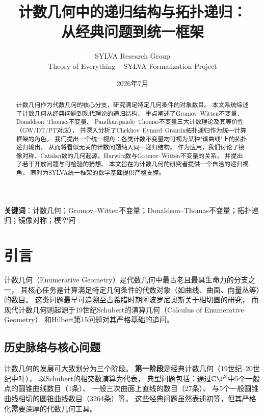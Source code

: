 \documentclass[11pt,a4paper]{article}
\title{\textbf{计数几何中的递归结构与拓扑递归：\\[2pt]
从经典问题到统一框架}}
\author{SYLVA Research Group \\[2pt]
\small Theory of Everything -- SYLVA Formalization Project}
\date{2026年7月}
\theoremstyle{plain}
\theoremstyle{definition}
\newcommand{\C}{\mathbb{C}}
\begin{document}
\maketitle

\begin{abstract}
计数几何作为代数几何的核心分支，研究满足特定几何条件的对象数目。
本文系统综述了计数几何从经典问题到现代理论的递归结构，
重点阐述了Gromov--Witten不变量、Donaldson--Thomas不变量、
Pandharipande--Thomas不变量三大计数理论及其等价性（GW/DT/PT对应），
并深入分析了Chekhov--Eynard--Orantin拓扑递归作为统一计算框架的角色。
我们提出一个统一视角：各类计数不变量均可视为某种"谱曲线"上的拓扑递归输出，
从而将看似无关的计数问题纳入同一递归结构。
作为应用，我们讨论了镜像对称、Catalan数的几何起源、Hurwitz数与Gromov--Witten不变量的关系，
并提出了若干开放问题与可检验的猜想。
本文旨在为计数几何的研究者提供一个自洽的递归视角，
同时为SYLVA统一框架的数学基础提供严格支撑。
\end{abstract}

\textbf{关键词}：计数几何；Gromov--Witten不变量；Donaldson--Thomas不变量；拓扑递归；镜像对称；模空间

\bigskip

\tableofcontents
\newpage



\section{引言}\label{sec:intro}

计数几何（Enumerative Geometry）是代数几何中最古老且最具生命力的分支之一，
其核心任务是计算满足特定几何条件的代数对象（如曲线、曲面、向量丛等）的数目。
这类问题最早可追溯至古希腊时期阿波罗尼奥斯关于相切圆的研究，
而现代计数几何则起源于19世纪Schubert的演算几何（Calculus of Enumerative Geometry）
和Hilbert第15问题对其严格基础的追问。

\subsection{历史脉络与核心问题}

计数几何的发展可大致划分为三个阶段。
\textbf{第一阶段}是经典计数几何（19世纪--20世纪中叶），
以Schubert的相交数演算为代表，
典型问题包括：通过$\C\P^2$中5个一般点的圆锥曲线数目（1条）、
一般三次曲面上直线的数目（27条）、
与5个一般圆锥曲线相切的圆锥曲线数目（3264条）等。
这些经典问题虽然表述初等，但其严格化需要深厚的代数几何工具。
\end{document}
